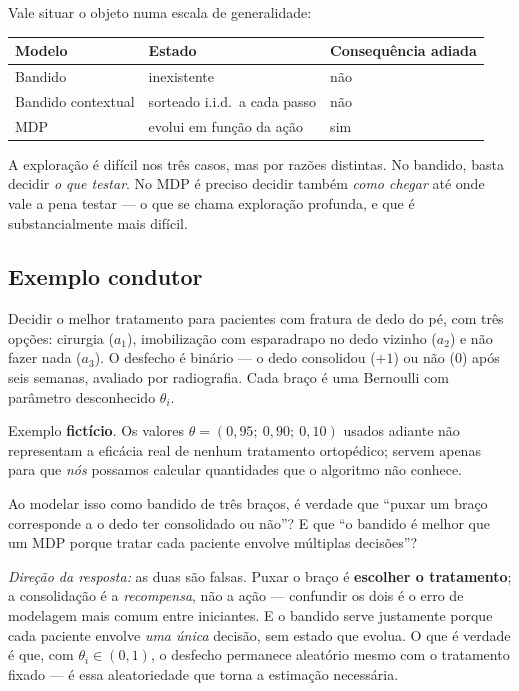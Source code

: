 \documentclass[11pt, a4paper]{article}
\begin{document}
Vale situar o objeto numa escala de generalidade:

\begin{center}
\begin{tabular}{lll}
\toprule
\textbf{Modelo} & \textbf{Estado} & \textbf{Consequência adiada} \\
\midrule
Bandido & inexistente & não \\
Bandido contextual & sorteado i.i.d.\ a cada passo & não \\
MDP & evolui em função da ação & sim \\
\bottomrule
\end{tabular}
\end{center}

A exploração é difícil nos três casos, mas por razões distintas. No bandido,
basta decidir \emph{o que testar}. No MDP é preciso decidir também
\emph{como chegar} até onde vale a pena testar — o que se chama exploração
profunda, e que é substancialmente mais difícil.

\subsection*{Exemplo condutor}

Decidir o melhor tratamento para pacientes com fratura de dedo do pé, com
três opções: cirurgia ($a_1$), imobilização com esparadrapo no dedo vizinho
($a_2$) e não fazer nada ($a_3$). O desfecho é binário — o dedo consolidou
($+1$) ou não ($0$) após seis semanas, avaliado por radiografia. Cada braço
é uma Bernoulli com parâmetro desconhecido $\theta_i$.

\begin{alertabox}
Exemplo \textbf{fictício}. Os valores $\theta = (0{,}95;\ 0{,}90;\ 0{,}10)$
usados adiante não representam a eficácia real de nenhum tratamento
ortopédico; servem apenas para que \emph{nós} possamos calcular quantidades
que o algoritmo não conhece.
\end{alertabox}

\begin{discbox}
Ao modelar isso como bandido de três braços, é verdade que ``puxar um braço
corresponde a o dedo ter consolidado ou não''? E que ``o bandido é melhor
que um MDP porque tratar cada paciente envolve múltiplas decisões''?

\smallskip
\emph{Direção da resposta:} as duas são falsas. Puxar o braço é
\textbf{escolher o tratamento}; a consolidação é a \emph{recompensa}, não a
ação — confundir os dois é o erro de modelagem mais comum entre iniciantes.
E o bandido serve justamente porque cada paciente envolve \emph{uma única}
decisão, sem estado que evolua. O que é verdade é que, com
$\theta_i \in (0,1)$, o desfecho permanece aleatório mesmo com o tratamento
fixado — é essa aleatoriedade que torna a estimação necessária.
\end{discbox}
\end{document}
